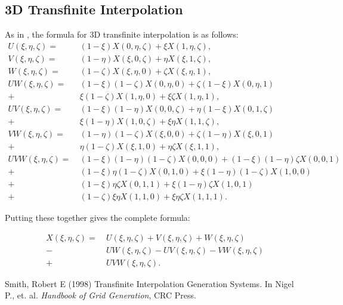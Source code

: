 \documentclass{article}
\newcommand{\ba}[1]{\begin{align*}    #1    \end{align*}}
\begin{document}
\subsection*{3D Transfinite Interpolation}
As in \cite{smith}, the formula for 3D transfinite interpolation is as follows:
\ba{
U(\xi, \eta, \zeta) = & \ (1-\xi)X(0,\eta, \zeta) + \xi X(1,\eta, \zeta), \\
V(\xi, \eta, \zeta) = & \ (1-\eta)X(\xi, 0, \zeta) + \eta X(\xi, 1, \zeta), \\
W(\xi, \eta, \zeta) = & \ (1-\zeta)X(\xi, \eta, 0) + \zeta X(\xi, \eta, 1), \\
UW(\xi, \eta, \zeta) = & \ (1-\xi)(1-\zeta) X(0, \eta, 0) + \zeta (1-\xi) X(0, \eta, 1)  \\
+ & \ \xi (1-\zeta) X(1,\eta, 0) + \xi \zeta X(1, \eta, 1), \\
UV(\xi, \eta, \zeta) = & \ (1-\xi)(1-\eta)X(0,0,\zeta) + \eta (1-\xi) X(0,1,\zeta)  \\
+ & \ \xi (1-\eta) X(1,0,\zeta) + \xi \eta X(1,1,\zeta), \\
VW(\xi, \eta, \zeta) = & \ (1-\eta)(1-\zeta)X(\xi,0,0) + \zeta (1-\eta) X(\xi, 0, 1)  \\
+ & \ \eta (1-\zeta) X(\xi, 1, 0) + \eta \zeta X(\xi, 1,1),  \\
UVW(\xi, \eta, \zeta) = & \ (1-\xi)(1-\eta)(1-\zeta)X(0,0,0) + (1-\xi)(1-\eta) \zeta X(0,0,1)  \\
+ & \ (1-\xi) \eta (1-\zeta) X(0,1,0) + \xi (1-\eta)(1- \zeta) X(1,0,0) \\
+ & \ (1-\xi) \eta \zeta X(0,1,1) + \xi (1-\eta) \zeta X(1,0,1) \\
+ & \ (1-\zeta) \xi \eta  X(1,1,0) + \xi \eta \zeta  X(1,1,1).
}

Putting these together gives the complete formula:

\ba{
X(\xi, \eta, \zeta) = & \  U(\xi, \eta, \zeta) + V(\xi, \eta, \zeta) + W(\xi, \eta, \zeta) \\
 - & \ UW(\xi, \eta, \zeta) - UV(\xi, \eta, \zeta) - VW(\xi, \eta, \zeta) \\
 + & \  UVW(\xi, \eta, \zeta).
}


\begin{thebibliography}{}
 Smith, Robert E (1998) Transfinite Interpolation Generation Systems. In Nigel P., et. al. {\it Handbook of Grid Generation}, CRC Press.
\end{thebibliography}
\end{document}
